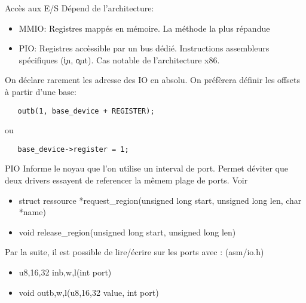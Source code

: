   \begin{frame}{Accès aux E/S}
    Dépend de l'architecture:
    \begin{itemize} 
    \item  MMIO:  Registres mappés  en  mémoire.  La  méthode la  plus
      répandue
    \item PIO:  Registres accèssible  par un bus  dédié.  Instructions
      assembleurs  spécifiques  (\c{in},   \c{out}).  Cas  notable  de
      l'architecture x86.
    \end{itemize}
On déclare rarement les adresse des IO en absolu. On préfèrera définir les offsets à partir d'une base:
\begin{lstlisting}
   outb(1, base_device + REGISTER);
\end{lstlisting} 
ou 
\begin{lstlisting}
   base_device->register = 1;
\end{lstlisting} 
  \end{frame}

  \begin{frame}{PIO}
Informe le noyau que l'on utilise un interval de port. Permet déviter que deux drivers essayent de referencer la mêmem plage de ports.
Voir 
    \begin{itemize} 
\item struct ressource *request_region(unsigned long start, unsigned long len, char *name)
\item void release_region(unsigned long start, unsigned long len)
    \end{itemize}
Par la suite, il est possible de lire/écrire sur les ports avec :
(asm/io.h)
\begin{itemize} 
\item u{8,16,32} in{b,w,l}(int port)
\item void out{b,w,l}(u{8,16,32} value, int port)
\end{itemize} 

  \end{frame} 

